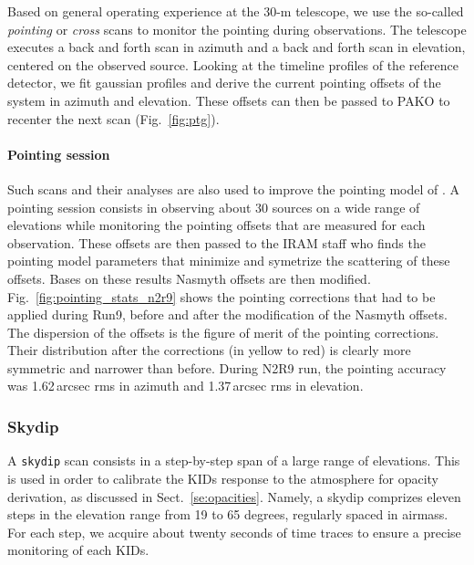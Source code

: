 Based on general operating experience at the 30-m telescope, we use the so-called
{\em pointing} or {\em cross} scans to monitor the pointing during observations. The
telescope executes a back and forth scan in azimuth and a back and forth scan in
elevation, centered on the observed source. Looking at the timeline profiles of
the reference detector, we fit gaussian profiles and derive the current pointing
offsets of the system in azimuth and elevation. These offsets can then be passed
to PAKO to recenter the next scan (Fig.~\ref{fig:ptg}).

\paragraph{Pointing session}
\label{se:pointing_session}

Such scans and their analyses are also used to improve the pointing model of
\nika. A pointing session consists in observing about 30 sources on a wide range
of elevations while monitoring the pointing offsets that are measured for each
observation. These offsets are then passed to the IRAM staff who finds the
pointing model parameters that minimize and symetrize the scattering of these
offsets. Bases on these results Nasmyth offsets are then
modified. Fig.~\ref{fig:pointing_stats_n2r9} shows the pointing corrections that
had to be applied during Run9, before and after the modification of the Nasmyth
offsets. The dispersion of the offsets is the figure of merit of the pointing
corrections. Their distribution after the corrections (in yellow to
red) is clearly more symmetric and narrower than before. During N2R9 run, the
pointing accuracy was 1.62\,arcsec rms in azimuth and 1.37\,arcsec rms in
elevation.

\subsubsection{Skydip}
\label{se:skydip}

A {\tt skydip} scan consists in a step-by-step span of a large range
of elevations.  This is used in order to calibrate the KIDs response
to the atmosphere for opacity derivation, as discussed in
Sect.~\ref{se:opacities}.  Namely, a skydip comprizes eleven steps in
the elevation range from 19 to 65 degrees, regularly spaced in
airmass. For each step, we acquire about twenty seconds of time traces
to ensure a precise monitoring of each KIDs.


